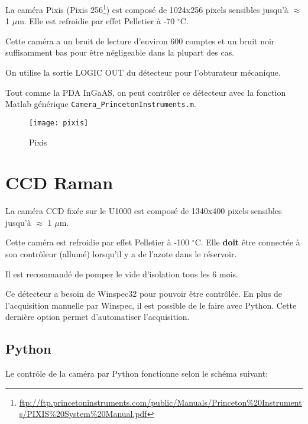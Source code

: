 \documentclass[11pt,francais]{book} %
\begin{document}
La caméra Pixis (Pixis 256\footnote{\url{ftp://ftp.princetoninstruments.com/public/Manuals/Princeton\%20Instruments/PIXIS\%20System\%20Manual.pdf}}) est composé de 1024x256 pixels sensibles jusqu'à $\approx$ 1 $\mu$m.
Elle est refroidie par effet Pelletier à -70 $^{\circ}$C.

Cette caméra a un bruit de lecture d'environ 600 comptes et un bruit noir suffisamment bas pour être négligeable dans la plupart des cas.

On utilise la sortie LOGIC OUT du détecteur pour l'obturateur mécanique.

Tout comme la PDA InGaAS, on peut contrôler ce détecteur avec la fonction Matlab générique \verb!Camera_PrincetonInstruments.m!.

\begin{figure}[htbp]
  \centering\texttt{[image: pixis]}
  \caption{Pixis}
  \label{fig:pixis}
\end{figure}



\section{CCD Raman}

La caméra CCD fixée sur le U1000 est composé de 1340x400 pixels sensibles jusqu'à $\approx$ 1 $\mu$m.

Cette caméra est refroidie par effet Pelletier à -100 $^{\circ}$C.
Elle {\bf doit} être connectée à son contrôleur (allumé) lorsqu'il y a de l'azote dans le réservoir.

Il est recommandé de pomper le vide d'isolation tous les 6 mois.

Ce détecteur a besoin de Winspec32 pour pouvoir être contrôlée.
En plus de l'acquisition manuelle par Winspec, il est possible de le faire avec Python.
Cette dernière option permet d'automatiser l'acquisition.

\subsection{Python}

Le contrôle de la caméra par Python fonctionne selon le schéma suivant: 
\begin{center}
\end{center}
\end{document}
